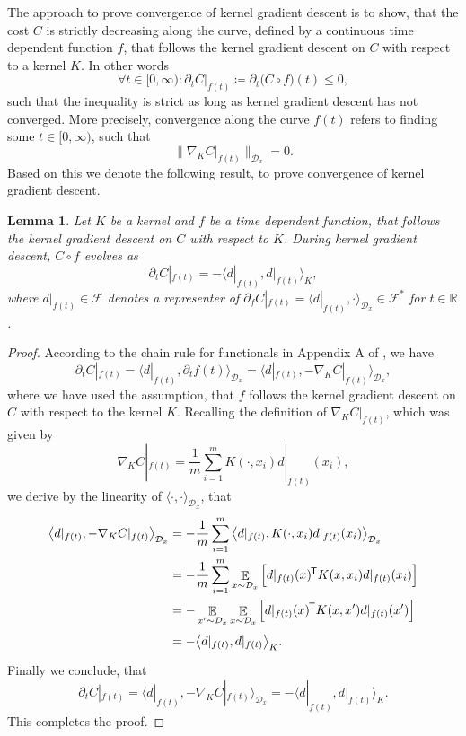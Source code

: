 \documentclass[11pt, a4paper]{article}
\newtheorem{lemma}[theorem]{Lemma}
\newcommand{\R}{\mathbb{R}}
\newcommand{\D}{\mathcal{D}}
\newcommand{\F}{\mathcal{F}}
\newcommand*{\tr}{^{\mkern-1.5mu\mathsf{T}}}
\DeclareMathOperator*{\E}{\mathbb{E}}
\begin{document}
The approach to prove convergence of kernel gradient descent is to show, that the cost $C$ is strictly decreasing along the curve, defined by a continuous time dependent function $f$, that follows the kernel gradient descent on $C$ with respect to a kernel $K$. In other words
\[ \forall t \in [0,\infty) : \partial_tC|_{f(t)} \coloneq \partial_t \big ( C \circ f \big )(t) \leq 0, \]
such that the inequality is strict as long as kernel gradient descent has not converged. More precisely, convergence along the curve $f(t)$ refers to finding some $t \in [0, \infty)$, such that
\[ \big \| \nabla_K C |_{f(t)}\big \|_{\D_x} = 0. \]
Based on this we denote the following result, to prove convergence of kernel gradient descent.

\begin{lemma}
Let $K$ be a kernel and $f$ be a time dependent function, that follows the kernel gradient descent on $C$ with respect to $K$. During kernel gradient descent, $C \circ f$ evolves as 
\[ \partial_tC|_{f(t)} = - \big \langle d|_{f(t)}, d|_{f(t)} \big \rangle_{K}, \]
where $d|_{f(t)} \in \F$ denotes a representer of $\partial_f C|_{f(t)} = \big \langle d|_{f(t)}, \cdot \big \rangle_{\D_x} \in \F^*$ for $t \in \R$.
\end{lemma}

\begin{proof}
According to the chain rule for functionals in Appendix A of \cite{Functionals}, we have
\[ \partial_tC|_{f(t)} = \big \langle d|_{f(t)}, \partial_t f(t) \big \rangle_{\D_x} = \big \langle d|_{f(t)}, - \nabla_K C|_{f(t)} \big \rangle_{\D_x}, \]
where we have used the assumption, that $f$ follows the kernel gradient descent on $C$ with respect to the kernel $K$.
Recalling the definition of $\nabla_K C|_{f(t)}$, which was given by
\[ \nabla_KC|_{f(t)} = \frac{1}{m} \sum_{i=1}^{m} K(\cdot,x_i)d|_{f(t)}(x_i), \]
we derive by the linearity of $\langle \cdot, \cdot \rangle_{\D_x}$, that
\[ \begin{split} 
\big \langle d|_{f(t)}, - \nabla_K C|_{f(t)} \big \rangle_{\D_x} 
&= - \frac{1}{m} \sum_{i=1}^{m} \big \langle d|_{f(t)}, K(\cdot,x_i)d|_{f(t)}(x_i) \big \rangle_{\D_x} \\\
&= - \frac{1}{m} \sum_{i=1}^{m} \E_{x \sim \D_x} \Big [ d|_{f(t)}(x)\tr K(x,x_i)d|_{f(t)}(x_i) \Big ] \\\
&= - \E_{x' \sim \D_x} \E_{x \sim \D_x} \Big [ d|_{f(t)}(x)\tr K(x,x')d|_{f(t)}(x') \Big ] \\\
\textcolor{white}{\Big |}&= - \big \langle d|_{f(t)}, d|_{f(t)} \big \rangle_{K}.
\end{split} \]
Finally we conclude, that
\[ \partial_tC|_{f(t)} = \big \langle d|_{f(t)}, - \nabla_K C|_{f(t)} \big \rangle_{\D_x} = - \big \langle d|_{f(t)}, d|_{f(t)} \big \rangle_{K}. \]
This completes the proof.
\end{proof}
\end{document}
